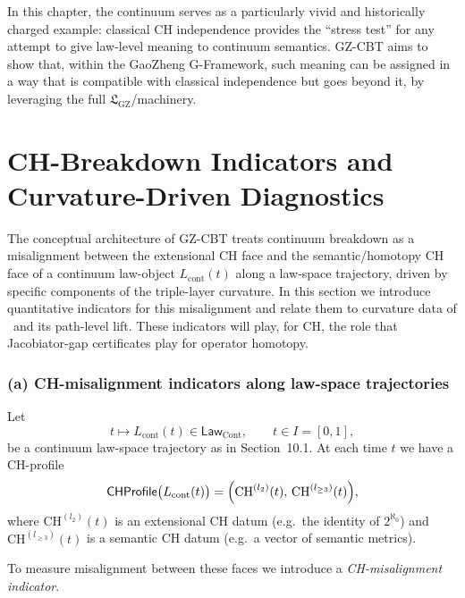 \documentclass[11pt]{book}
\theoremstyle{plain}
\theoremstyle{definition}
\newcommand{\GZLS}{\ensuremath{\mathfrak{L}_{\mathrm{GZ}}}}       \newcommand{\GZLT}{\ensuremath{M_{!w}}}                           \newcommand{\GZLOC}{\ensuremath{A_M}}                             \newcommand{\GZLCurv}{\ensuremath{\mathcal{F}_{\mathrm{law}}}}
\begin{document}
In this chapter, the continuum serves as a particularly vivid and
historically charged example: classical CH independence provides the
“stress test” for any attempt to give law-level meaning to continuum
semantics. GZ-CBT aims to show that, within the GaoZheng G-Framework,
such meaning can be assigned in a way that is compatible with
classical independence but goes beyond it, by leveraging the full
\GZLS/\GZGMS machinery.



\section{CH-Breakdown Indicators and Curvature-Driven Diagnostics}


The conceptual architecture of GZ-CBT treats continuum breakdown as a
misalignment between the extensional CH face and the semantic/homotopy
CH face of a continuum law-object $L_{\mathrm{cont}}(t)$ along a
law-space trajectory, driven by specific components of the triple-layer
curvature. In this section we introduce quantitative indicators for
this misalignment and relate them to curvature data of \GZTLC\ and its
path-level lift. These indicators will play, for CH, the role that
Jacobiator-gap certificates play for operator homotopy.



\subsubsection*{(a) CH-misalignment indicators along law-space trajectories}

Let
\[
   t \longmapsto L_{\mathrm{cont}}(t)
   \in \mathsf{Law}_{\mathrm{Cont}},
   \qquad t\in I=[0,1],
\]
be a continuum law-space trajectory as in Section~10.1. At each time
$t$ we have a CH-profile
\[
   \mathsf{CHProfile}\bigl(L_{\mathrm{cont}}(t)\bigr)
   =
   \Bigl(
     \mathrm{CH}^{(l_2)}(t),\,
     \mathrm{CH}^{(l_{\ge3})}(t)
   \Bigr),
\]
where $\mathrm{CH}^{(l_2)}(t)$ is an extensional CH datum (e.g.\ the
identity of $2^{\aleph_0}$) and $\mathrm{CH}^{(l_{\ge3})}(t)$ is a
semantic CH datum (e.g.\ a vector of semantic metrics).

To measure misalignment between these faces we introduce a
\emph{CH-misalignment indicator}.
\end{document}
